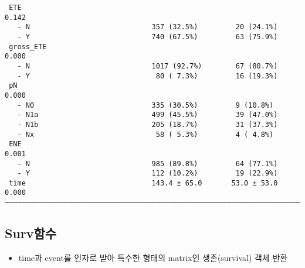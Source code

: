 \documentclass[
  letterpaper,
  DIV=11,
  numbers=noendperiod]{scrartcl}
\newenvironment{Shaded}{\begin{snugshade}}{\end{snugshade}}
\newcommand{\AttributeTok}[1]{\textcolor[rgb]{0.40,0.45,0.13}{#1}}
\newcommand{\CommentTok}[1]{\textcolor[rgb]{0.37,0.37,0.37}{#1}}
\newcommand{\DocumentationTok}[1]{\textcolor[rgb]{0.37,0.37,0.37}{\textit{#1}}}
\newcommand{\FunctionTok}[1]{\textcolor[rgb]{0.28,0.35,0.67}{#1}}
\newcommand{\NormalTok}[1]{\textcolor[rgb]{0.00,0.23,0.31}{#1}}
\newcommand{\OtherTok}[1]{\textcolor[rgb]{0.00,0.23,0.31}{#1}}
\newcommand{\SpecialCharTok}[1]{\textcolor[rgb]{0.37,0.37,0.37}{#1}}
\providecommand{\tightlist}{%
  \setlength{\itemsep}{0pt}\setlength{\parskip}{0pt}}\usepackage{longtable,booktabs,array}
\begin{document}
\begin{verbatim}
 ETE                                                                  0.142
   - N                             357 (32.5%)         20 (24.1%)          
   - Y                             740 (67.5%)         63 (75.9%)          
 gross_ETE                                                            0.000
   - N                             1017 (92.7%)        67 (80.7%)          
   - Y                              80 ( 7.3%)         16 (19.3%)          
 pN                                                                   0.000
   - N0                            335 (30.5%)         9 (10.8%)           
   - N1a                           499 (45.5%)         39 (47.0%)          
   - N1b                           205 (18.7%)         31 (37.3%)          
   - Nx                             58 ( 5.3%)         4 ( 4.8%)           
 ENE                                                                  0.001
   - N                             985 (89.8%)         64 (77.1%)          
   - Y                             112 (10.2%)         19 (22.9%)          
 time                              143.4 ± 65.0       53.0 ± 53.0     0.000
——————————————————————————————————————————————————————————————————————————— 
\end{verbatim}

\subsection{Surv함수}\label{survuxd568uxc218}

\begin{itemize}
\tightlist
\item
  time과 event를 인자로 받아 특수한 형태의 matrix인 생존(survival) 객체
  반환
\end{itemize}

\begin{Shaded}
\end{Shaded}
\end{document}
